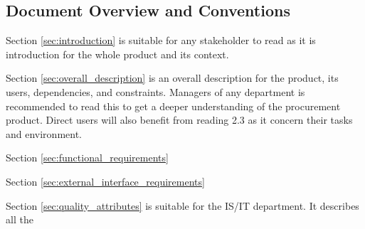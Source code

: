 \subsection{Document Overview and Conventions}
Section \ref{sec:introduction} is suitable for any stakeholder to read as it is introduction for the whole product and its context.	

Section \ref{sec:overall_description} is an overall description for the product, its users, dependencies, and constraints. Managers of any department is recommended to read this to get a deeper understanding of the procurement product. Direct users will also benefit from reading 2.3 as it concern their tasks and environment.

Section \ref{sec:functional_requirements}

Section \ref{sec:external_interface_requirements}

Section \ref{sec:quality_attributes} is suitable for the IS/IT department. It describes all the 

